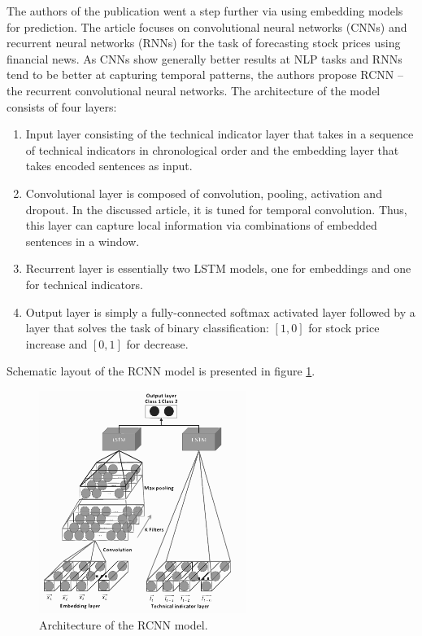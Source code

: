 \documentclass[3p,times,procedia]{elsarticle}
\begin{document}
The authors of the publication \cite{vargas2017deep} went a step further via using embedding models for prediction. The article focuses on convolutional neural networks (CNNs) and recurrent neural networks (RNNs) for the task of forecasting stock prices using financial news. As CNNs show generally better results at NLP tasks and RNNs tend to be better at capturing temporal patterns, the authors propose RCNN -- the recurrent convolutional neural networks. The architecture of the model consists of four layers:
\begin{enumerate}
	\item Input layer consisting of the technical indicator layer that takes in a sequence of technical indicators in chronological order and the embedding layer that takes encoded sentences as input.
	\item Convolutional layer is composed of convolution, pooling, activation and dropout. In the discussed article, it is tuned for temporal convolution. Thus, this layer can capture local information via combinations of embedded sentences in a window.
	\item Recurrent layer is essentially two LSTM models, one for embeddings and one for technical indicators.
	\item Output layer is simply a fully-connected softmax activated layer followed by a layer that solves the task of binary classification: $[1,0]$ for stock price increase and $[0,1]$ for decrease. 
\end{enumerate}

Schematic layout of the RCNN model is presented in figure \ref{fig:gr5}. 
\begin{figure}[h!]\vspace*{4pt}
	\centerline{\includegraphics[width=0.6\textwidth]{./visuals/gr5.pdf}}
\caption{Architecture of the RCNN model.}
\label{fig:gr5}
\end{figure}
\end{document}
